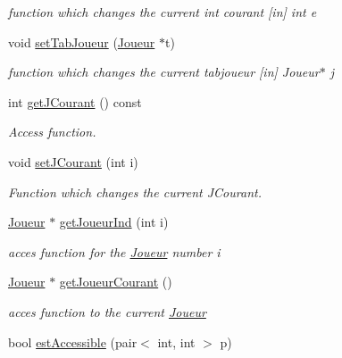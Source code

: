 \begin{DoxyCompactItemize}
\begin{DoxyCompactList}\small\item\em function which changes the current int courant \mbox{[}in\mbox{]} int e \item\end{DoxyCompactList}\item 
void \hyperlink{class_moteur_jeu_a4ce4d58bc6e7c895cc8a95102aaca09d}{setTabJoueur} (\hyperlink{class_joueur}{Joueur} $\ast$t)
\begin{DoxyCompactList}\small\item\em function which changes the current tabjoueur \mbox{[}in\mbox{]} Joueur$\ast$ j \item\end{DoxyCompactList}\item 
int \hyperlink{class_moteur_jeu_ae63d83716e54ca6f3fe59c43523363d8}{getJCourant} () const 
\begin{DoxyCompactList}\small\item\em Access function. \item\end{DoxyCompactList}\item 
\hypertarget{class_moteur_jeu_a4f73411a3745c180d74085382d823294}{
void \hyperlink{class_moteur_jeu_a4f73411a3745c180d74085382d823294}{setJCourant} (int i)}
\label{class_moteur_jeu_a4f73411a3745c180d74085382d823294}

\begin{DoxyCompactList}\small\item\em Function which changes the current JCourant. \item\end{DoxyCompactList}\item 
\hyperlink{class_joueur}{Joueur} $\ast$ \hyperlink{class_moteur_jeu_a985bcd836a94056b4c3f00d12a181dfc}{getJoueurInd} (int i)
\begin{DoxyCompactList}\small\item\em acces function for the \hyperlink{class_joueur}{Joueur} number i \item\end{DoxyCompactList}\item 
\hyperlink{class_joueur}{Joueur} $\ast$ \hyperlink{class_moteur_jeu_ab24fe5ea8707ddac6dfb903c4dc8dd34}{getJoueurCourant} ()
\begin{DoxyCompactList}\small\item\em acces function to the current \hyperlink{class_joueur}{Joueur} \item\end{DoxyCompactList}\item 
\hypertarget{class_moteur_jeu_abedf613946c850423de823d11fa86064}{
bool \hyperlink{class_moteur_jeu_abedf613946c850423de823d11fa86064}{estAccessible} (pair$<$ int, int $>$ p)}
\label{class_moteur_jeu_abedf613946c850423de823d11fa86064}


\end{DoxyCompactItemize}
